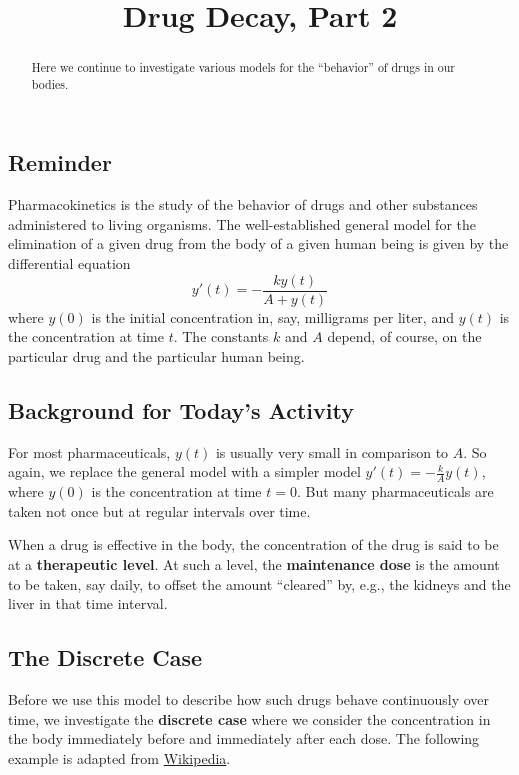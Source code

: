 \documentclass{ximera}
\title{Drug Decay, Part 2}
\begin{document}
\begin{abstract}
Here we continue to investigate various models for the ``behavior'' of drugs in our bodies.  
\end{abstract}
\maketitle

\subsection{Reminder}
Pharmacokinetics is the study of the behavior of drugs and other substances administered to living organisms.  
The well-established general model for 
the elimination of a given drug from the body of a given human being is given by the differential equation 
$$y'(t)=-\frac{ky(t)}{A+y(t)}$$
where $y(0)$ is the initial concentration in, say, milligrams per liter, and $y(t)$ is the concentration at time $t$.  The constants $k$ and $A$ depend, of course, on the particular drug and the particular human being. 


\subsection{Background for Today's Activity}
For most pharmaceuticals, $y(t)$ is usually very small in comparison
to $A$.  So again, we replace the general model with a simpler model
$y'(t)=-\frac{k}{A}y(t)$, where $y(0)$ is the concentration at time
$t=0$.  But many pharmaceuticals are taken not once but at regular
intervals over time.

When a drug is effective in the body, the concentration of the drug is
said to be at a \textbf{therapeutic level}.  At such a level, the
\textbf{maintenance dose} is the amount to be taken, say daily, to
offset the amount ``cleared'' by, e.g., the kidneys and the liver in
that time interval.

\subsection{The Discrete Case}
Before we use this model to describe how such drugs behave
continuously over time, we investigate the \textbf{discrete case}
where we consider the concentration in the body immediately before and
immediately after each dose.  The following example is adapted from
\href{http://en.wikipedia.org/wiki/Loading_dose}{Wikipedia}.
\end{document}
